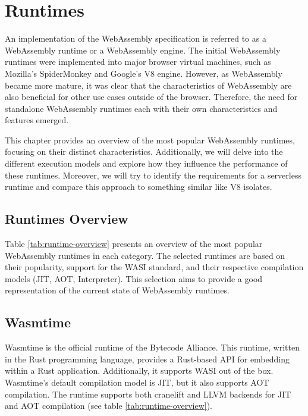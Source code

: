 \chapter{Runtimes}
\label{chap:runtimes}

An implementation of the WebAssembly specification \cite{webassemblycommunitygroup_2023_webassembly} is referred to as a WebAssembly runtime or a WebAssembly engine. The initial WebAssembly runtimes were implemented into major browser virtual machines, such as Mozilla's SpiderMonkey and Google's V8 engine. However, as WebAssembly became more mature, it was clear that the characteristics of WebAssembly are also beneficial for other use cases outside of the browser. Therefore, the need for standalone WebAssembly runtimes each with their own characteristics and features emerged. 

This chapter provides an overview of the most popular WebAssembly runtimes, focusing on their distinct characteristics. Additionally, we will delve into the different execution models and explore how they influence the performance of these runtimes. Moreover, we will try to identify the requirements for a \gls{serverless} runtime and compare this approach to something similar like V8 isolates. 

\section{Runtimes Overview}
\label{sec:runtimes-overview}

Table \ref{tab:runtime-overview} presents an overview of the most popular WebAssembly runtimes in each category. The selected runtimes are based on their popularity, support for the WASI standard, and their respective compilation models (JIT, AOT, Interpreter). This selection aims to provide a good representation of the current state of WebAssembly runtimes. 



\section{Wasmtime}
\label{sec:wasmtime}

Wasmtime \cite{bytecodealliance_2022_wasmtime} is the official runtime of the Bytecode Alliance. This runtime, written in the Rust programming language, provides a Rust-based API for embedding within a Rust application. Additionally, it supports WASI out of the box. Wasmtime's default compilation model is JIT, but it also supports AOT compilation. The runtime supports both cranelift and \gls{LLVM} backends for JIT and AOT compilation (see table \ref{tab:runtime-overview}).

